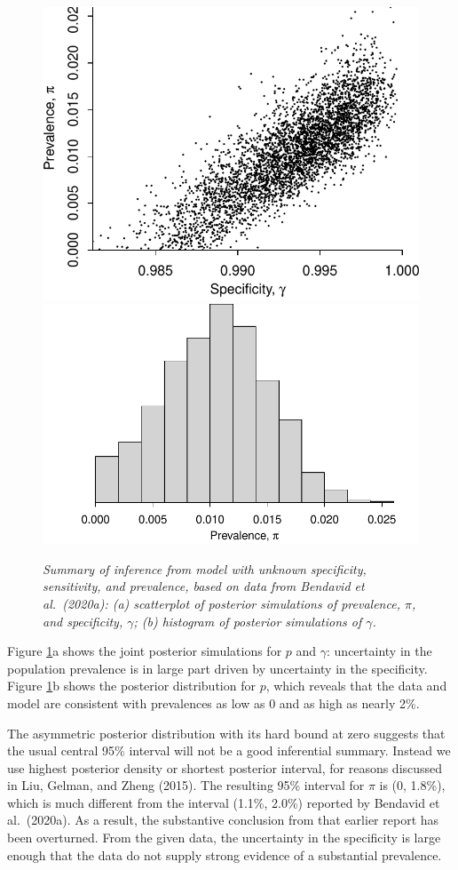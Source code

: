 \documentclass[11pt]{article}
\begin{document}
 \begin{figure}
\centerline{ \includegraphics[width=.45\textwidth]{scatter.pdf} \includegraphics[width=.55\textwidth]{hist.pdf}}
\caption{\em Summary of inference from model with unknown specificity, sensitivity, and prevalence, based on data from Bendavid et al.\ (2020a):  (a) scatterplot of posterior simulations of prevalence, $\pi$, and specificity, $\gamma$; (b) histogram of posterior simulations of $\gamma$.}
\label{posterior1}
\end{figure}

Figure \ref{posterior1}a shows the joint posterior simulations for $p$ and $\gamma$:  uncertainty in the population prevalence is in large part driven by uncertainty in the specificity.  Figure \ref{posterior1}b shows the posterior distribution for $p$, which reveals that the data and model are consistent with prevalences as low as 0 and as high as nearly 2\%.

The asymmetric posterior distribution with its hard bound at zero suggests that the usual central 95\% interval will not be a good inferential summary.  Instead we use highest posterior density or shortest posterior interval, for reasons discussed in Liu, Gelman, and Zheng (2015). The resulting 95\% interval for $\pi$ is (0, 1.8\%), which is much different from the interval (1.1\%, 2.0\%) reported by Bendavid et al.\ (2020a).  As a result, the substantive conclusion from that earlier report has been overturned. From the given data, the uncertainty in the specificity is large enough that the data do not supply strong evidence of a substantial prevalence.
\end{document}

